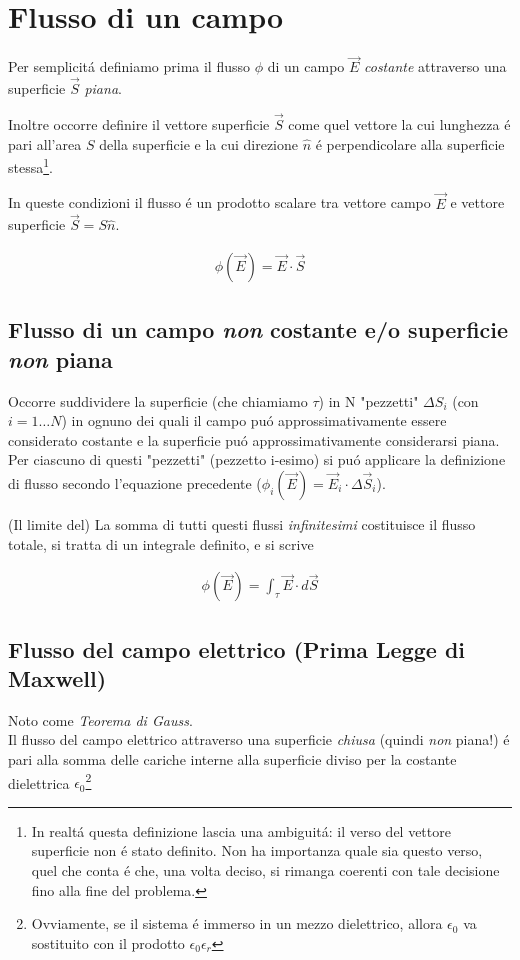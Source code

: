 \documentclass[17pt]{article}
\begin{document}
\section{Flusso di un campo}\label{sec:flusso}
Per semplicit\'a definiamo prima il flusso $\phi$ di un campo $\vec{E}$ \emph{costante} attraverso una superficie $\vec{S}$ \emph{piana}. 

Inoltre occorre definire il vettore superficie $\vec{S}$ come quel vettore la cui lunghezza \'e pari all'area $S$ della superficie e la cui direzione $\hat{n}$ \'e perpendicolare alla superficie stessa\footnote{In realt\'a questa definizione lascia una ambiguit\'a: il verso del vettore superficie non \'e stato definito. Non ha importanza quale sia questo verso, quel che conta \'e che, una volta deciso, si rimanga coerenti con tale decisione fino alla fine del problema.}. 

In queste condizioni il flusso \'e un prodotto scalare tra vettore campo $\vec{E}$ e vettore superficie $\vec{S}=S\hat{n}$. 

\begin{eqnarray}\label{eq:flusso}
	\phi(\vec{E}) = \vec{E}\cdot\vec{S}
\end{eqnarray}
	

\subsection{Flusso di un campo \emph{non} costante e/o superficie \emph{non} piana}

Occorre suddividere la superficie (che chiamiamo $\tau$) in N "pezzetti" $\Delta S_i$ (con $i = 1\dots N$) in ognuno dei quali il campo pu\'o approssimativamente essere considerato costante e la superficie pu\'o approssimativamente considerarsi piana. Per ciascuno di questi "pezzetti" (pezzetto i-esimo) si pu\'o applicare la definizione di flusso secondo l'equazione precedente ($\phi_i(\vec{E}) = \vec{E}_i\cdot\Delta\vec{S}_i$).

(Il limite del) La somma di tutti questi flussi \emph{infinitesimi} costituisce il flusso totale, si tratta di un integrale definito, e si scrive

\begin{eqnarray}
	\phi(\vec{E}) = \int_{\tau}\vec{E}\cdot d\vec{S} 
\end{eqnarray}


\subsection{Flusso del campo elettrico (Prima Legge di Maxwell)}
Noto come \emph{Teorema di Gauss}.\\
Il flusso del campo elettrico attraverso una superficie \emph{chiusa} (quindi \emph{non} piana!) \'e pari alla somma delle cariche interne alla superficie diviso per la costante dielettrica $\epsilon_0$\footnote{Ovviamente, se il sistema \'e immerso in un mezzo dielettrico, allora $\epsilon_0$ va sostituito con il prodotto $\epsilon_0\epsilon_r$}
\end{document}
